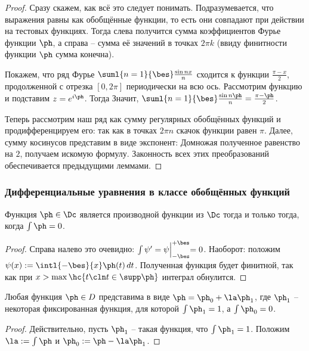 \documentclass[a4paper]{article}
\newcommand{\Bsub}[2]{\Bigl|_{#1}^{#2}}
\newcommand{\dt}{\,dt}
\begin{document}
\begin{theorem}
\end{theorem}
\begin{proof}
Сразу скажем, как всё это следует понимать. Подразумевается, что выражения равны как обобщённые функции, то есть
они совпадают при действии на тестовых функциях. Тогда слева получится сумма коэффициентов Фурье функции $\ph$,
а справа -- сумма её значений в точках $2\pi k$ (ввиду финитности функции $\ph$ сумма конечна).

Покажем, что ряд Фурье $\suml{n=1}{\bes}\frac{\sin nx}{n}$ сходится к функции $\frac{\pi-x}{2}$, продолженной
с отрезка $[0,2\pi]$ периодически на всю ось. Рассмотрим функцию
и подставим $z = e^{i\ph}$. Тогда
Значит, $\suml{n=1}{\bes}\frac{\sin n\ph}{n} = \frac{\pi-\ph}{2}$.

Теперь рассмотрим наш ряд как сумму регулярных обобщённых функций и продифференцируем его:
так как в точках $2\pi n$ скачок функции равен $\pi$. Далее, сумму косинусов представим в виде экспонент:
Домножая полученное равенство на $2$, получаем искомую формулу. Законность всех этих преобразований обеспечивается
предыдущими леммами.
\end{proof}

\subsubsection{Дифференциальные уравнения в классе обобщённых функций}

\begin{lemma}
Функция $\ph \in \Dc$ является производной функции из $\Dc$ тогда и только тогда, когда $\int \ph = 0$.
\end{lemma}
\begin{proof}
Справа налево это очевидно: $\int \psi' =\psi\Bsub{-\bes}{+\bes} = 0$. Наоборот: положим
$\psi(x) := \intl{-\bes}{x}\ph(t)\dt$. Полученная функция будет финитной, так как при $x > \max \hc{t\cln t\in \supp \ph}$
интеграл обнулится.
\end{proof}
\begin{imp}
Любая функция $\ph\in D$ представима в виде $\ph = \ph_0 + \la \ph_1$, где $\ph_1$ -- некоторая фиксированная
функция, для которой $\int \ph_1 = 1$, а $\int \ph_0 = 0$.
\end{imp}
\begin{proof}
Действительно, пусть $\ph_1$ -- такая функция, что $\int \ph_1 =1$. Положим
$\la := \int\ph$ и $\ph_0 := \ph - \la \ph_1$.
\end{proof}
\end{document}
